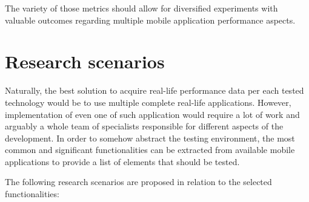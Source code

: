 The variety of those metrics should allow for diversified experiments with valuable outcomes regarding multiple mobile application performance aspects.

\section{Research scenarios}

Naturally, the best solution to acquire real-life performance data per each tested technology would be to use multiple complete real-life applications. However, implementation of even one of such application would require a lot of work and arguably a whole team of specialists responsible for different aspects of the development. In order to somehow abstract the testing environment, the most common and significant functionalities can be extracted from available mobile applications to provide a list of elements that should be tested.

\bigskip

The following research scenarios are proposed in relation to the selected functionalities:


